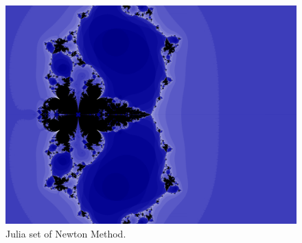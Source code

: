 \documentclass[english,11pt]{article} %
\begin{document}
\begin{figure}
\centering
  \includegraphics[scale=1]{"../Newton Method/high_resolution_MP_null"}
\caption{Julia set of Newton Method.}
\label{fig1}
\end{figure}
\end{document}
